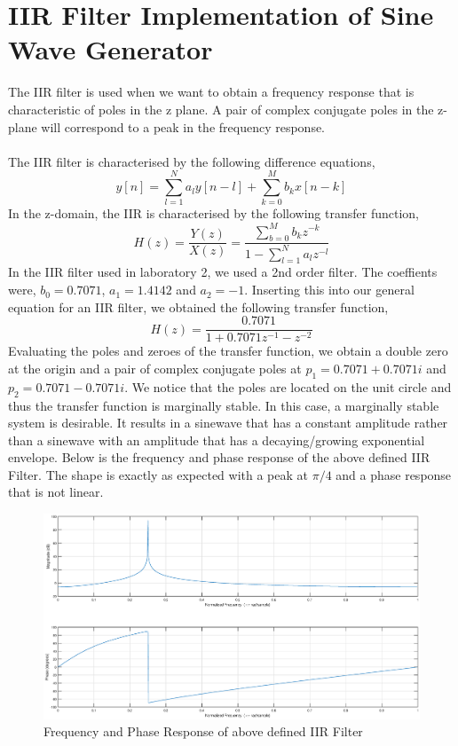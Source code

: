 \documentclass{article}
\begin{document}
\section{IIR Filter Implementation of Sine Wave Generator}
The IIR filter is used when we want to obtain a frequency response that is characteristic of poles in the z plane. A pair of complex conjugate poles in the z-plane will correspond to a peak in the frequency response.\\\\
The IIR filter is characterised by the following difference equations,
\begin{equation}
    y[n]=\sum_{l=1}^{N} a_{l}y[n-l]+\sum_{k=0}^{M} b_{k}x[n-k]
\end{equation}
In the z-domain, the IIR is characterised by the following transfer function,
\begin{equation}
    H(z) = \frac{Y(z)}{X(z)} = \frac{\sum_{b=0}^{M}b_{k}z^{-k}}{1-\sum_{l=1}^{N}a_{l}z^{-l}}
\end{equation}
In the IIR filter used in laboratory 2, we used a 2nd order filter. The coeffients were, $b_{0}=0.7071$, $a_{1}=1.4142$ and $a_{2}=-1$. Inserting this into our general equation for an IIR filter, we obtained the following transfer function,
\begin{equation}
    H(z) = \frac{0.7071}{1+0.7071z^{-1}-z^{-2}}
\end{equation}
Evaluating the poles and zeroes of the transfer function, we obtain a double zero at the origin and a pair of complex conjugate poles at $p_{1}=0.7071+0.7071i$ and $p_{2}=0.7071-0.7071i$. We notice that the poles are located on the unit circle and thus the transfer function is marginally stable. In this case, a marginally stable system is desirable. It results in a sinewave that has a constant amplitude rather than a sinewave with an amplitude that has a decaying/growing exponential envelope. Below is the frequency and phase response of the above defined IIR Filter. The shape is exactly as expected with a peak at $\pi/4$ and a phase response that is not linear. 
\begin{figure}[h]
    \centering{}
    \includegraphics[scale=0.3]{frequencyresponse.eps}
    \caption{Frequency and Phase Response of above defined IIR Filter}
\end{figure}
\end{document}
